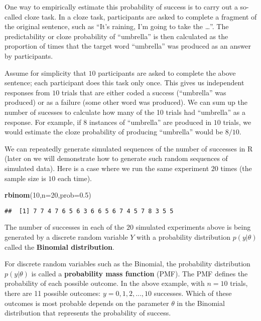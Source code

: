 \documentclass[12pt,]{krantz}
\newenvironment{Shaded}{\begin{snugshade}}{\end{snugshade}}
\newcommand{\DataTypeTok}[1]{\textcolor[rgb]{0.13,0.29,0.53}{#1}}
\newcommand{\DecValTok}[1]{\textcolor[rgb]{0.00,0.00,0.81}{#1}}
\newcommand{\FloatTok}[1]{\textcolor[rgb]{0.00,0.00,0.81}{#1}}
\newcommand{\KeywordTok}[1]{\textcolor[rgb]{0.13,0.29,0.53}{\textbf{#1}}}
\newcommand{\NormalTok}[1]{#1}
\begin{document}
One way to empirically estimate this probability of success is to carry out a so-called cloze task. In a cloze task, participants are asked to complete a fragment of the original sentence, such as ``It's raining, I'm going to take the \ldots{}''. The predictability or cloze probability of ``umbrella'' is then calculated as the proportion of times that the target word ``umbrella'' was produced as an answer by participants.

Assume for simplicity that \(10\) participants are asked to complete the above sentence; each participant does this task only once. This gives us independent responses from \(10\) trials that are either coded a success (``umbrella'' was produced) or as a failure (some other word was produced). We can sum up the number of sucesses to calculate how many of the 10 trials had ``umbrella'' as a response. For example, if \(8\) instances of ``umbrella'' are produced in \(10\) trials, we would estimate the cloze probability of producing ``umbrella'' would be \(8/10\).

We can repeatedly generate simulated sequences of the number of successes in R (later on we will demonstrate how to generate such random sequences of simulated data). Here is a case where we run the same experiment \(20\) times (the sample size is \(10\) each time).

\begin{Shaded}
\begin{Highlighting}[]
\KeywordTok{rbinom}\NormalTok{(}\DecValTok{10}\NormalTok{,}\DataTypeTok{n=}\DecValTok{20}\NormalTok{,}\DataTypeTok{prob=}\FloatTok{0.5}\NormalTok{)}
\end{Highlighting}
\end{Shaded}

\begin{verbatim}
##  [1] 7 7 4 7 6 5 6 3 6 6 5 6 7 4 5 7 8 3 5 5
\end{verbatim}

The number of successes in each of the \(20\) simulated experiments above is being generated by a discrete random variable \(Y\) with a probability distribution \(p(y|\theta)\) called the \textbf{Binomial distribution}.

For discrete random variables such as the Binomial, the probability distribution \(p(y|\theta)\) is called a \textbf{probability mass function} (PMF). The PMF defines the probability of each possible outcome. In the above example, with \(n=10\) trials, there are 11 possible outcomes: \(y=0,1,2,...,10\) successes. Which of these outcomes is most probable depends on the parameter \(\theta\) in the Binomial distribution that represents the probability of success.
\end{document}
